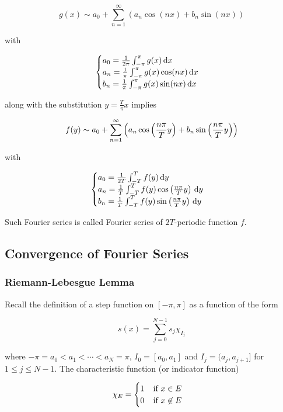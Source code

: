\documentclass[a4paper,12pt]{article}
\begin{document}
$$g(x)\sim a_{0}+\sum_{n=1}^{\infty}(a_{n}\cos(nx)+b_{n}\sin(nx))$$\s

with

$$\begin{cases}
  a_{0}=\frac{1}{2\pi}\int_{-\pi}^{\pi}g(x)\,\mathrm{d} x\\
  a_{n}=\frac{1}{\pi}\int_{-\pi}^{\pi}g(x)\cos(nx)\,\mathrm{d} x\\
  b_{n}=\frac{1}{\pi}\int_{-\pi}^{\pi}g(x)\sin(nx)\,\mathrm{d} x
\end{cases}$$\s

along with the substitution $y=\frac{T}{\pi}x$ implies

$$f(y)\sim a_{0}+\sum_{n=1}^{\infty}\left( a_{n}\cos\left( \frac{n\pi}{T}y\right)+b_{n}\sin\left( \frac{n\pi}{T}y\right)\right)$$\s

with

$$\begin{cases}
  a_{0}=\frac{1}{2T}\int_{-T}^{T}f(y)\,\mathrm{d} y\\
  a_{n}=\frac{1}{T}\int_{-T}^{T}f(y)\cos\left( \frac{n\pi}{T}y\right)\,\mathrm{d} y\\
  b_{n}=\frac{1}{T}\int_{-T}^{T}f(y)\sin\left( \frac{n\pi}{T}y\right)\,\mathrm{d} y
\end{cases}$$\s

Such Fourier series is called Fourier series of $2T$-periodic function $f$.

\subsection{Convergence of Fourier Series}
\subsubsection{Riemann-Lebesgue Lemma}
Recall the definition of a step function on $[-\pi,\pi]$ as a function of the form

$$s(x)=\sum_{j=0}^{N-1}s_{j}\chi_{I_{j}}$$\s

where $-\pi=a_{0}<a_{1}<\cdots<a_{N}=\pi$, $I_{0}=[a_{0},a_{1}]$ and $I_{j}=(a_{j},a_{j+1}]$ for $1\leq j\leq N-1$. The characteristic function (or indicator function)

$$\chi_{E}=\begin{cases}
  1\;\;\;\;\text{if }x\in E\\
  0\;\;\;\;\text{if }x\not\in E
\end{cases}$$\s
\end{document}
